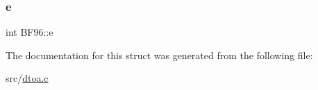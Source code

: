 \mbox{\label{struct_b_f96_a204f2f5a2bd7cd95dde8d04f777c0048}} 
\subsubsection{\texorpdfstring{e}{e}}
{\footnotesize\ttfamily int B\+F96\+::e}



The documentation for this struct was generated from the following file\+:\begin{DoxyCompactItemize}
\item 
src/\hyperlink{dtoa_8c}{dtoa.\+c}\end{DoxyCompactItemize}
